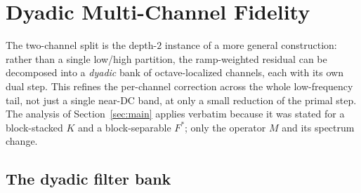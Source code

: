 \documentclass{article}
\begin{document}
\section{Dyadic Multi-Channel Fidelity}
\label{sec:dyadic}

The two-channel split is the depth-$2$ instance of a more general construction: rather than a single low/high partition, the ramp-weighted residual can be decomposed into a \emph{dyadic} bank of octave-localized channels, each with its own dual step. This refines the per-channel correction across the whole low-frequency tail, not just a single near-DC band, at only a small reduction of the primal step. The analysis of Section~\ref{sec:main} applies verbatim because it was stated for a block-stacked $K$ and a block-separable $F^\ast$; only the operator $M$ and its spectrum change.

\subsection{The dyadic filter bank}
\label{sec:dyadic-setup}
\end{document}
